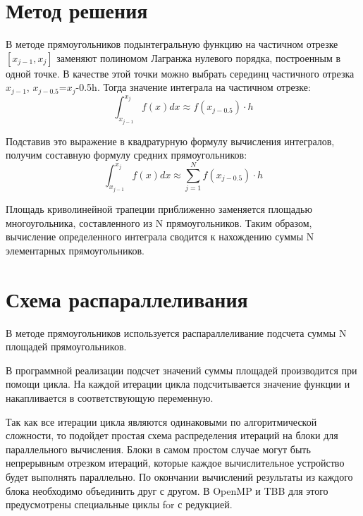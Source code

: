 \documentclass{report}
\begin{document}
\section*{Метод решения}
В методе прямоугольников подынтегральную функцию на частичном отрезке $\left[x_{j-1}, x_{j}\right]$ заменяют полиномом Лагранжа нулевого порядка, построенным в одной точке. В качестве этой точки можно выбрать серединц частичного отрезка $x_{j-1}$, $x_{j-0.5}$=$x_{j}$-0.5h. Тогда значение интеграла на частичном отрезке:
\begin{equation}
\int_{x_{j-1}}^{x_{j}}{f\left(x \right)dx \approx f\left(x_{j-0.5}\right)\cdot h}
\end{equation}
\par Подставив это выражение в квадратурную формулу вычисления интегралов, получим составную формулу средних прямоугольников:
\begin{equation}
\int_{x_{j-1}}^{x_{j}}{f\left(x \right)dx \approx \sum_{j=1}^{N}{f\left(x_{j-0.5} \right)\cdot h}}
\end{equation}
\par Площадь криволинейной трапеции приближенно заменяется площадью многоугольника, составленного из N прямоугольников. Таким образом, вычисление определенного интеграла сводится к нахождению суммы N элементарных прямоугольников.
\newpage

\section*{Схема распараллеливания}
В методе прямоугольников используется распараллеливание подсчета суммы N площадей прямоугольников.
\par В программной реализации подсчет значений суммы площадей производится при помощи цикла. На каждой итерации цикла подсчитывается значение функции и накапливается в соответствующую переменную.
\par Так как все итерации цикла являются одинаковыми по алгоритмической сложности, то подойдет простая схема распределения итераций на блоки для параллельного вычисления. Блоки в самом простом случае могут быть непрерывным отрезком итераций, которые каждое вычислительное устройство будет выполнять параллельно. По окончании вычислений результаты из каждого блока необходимо объединить друг с другом. В OpenMP и TBB для этого предусмотрены специальные циклы for с редукцией.
\newpage
\end{document}
